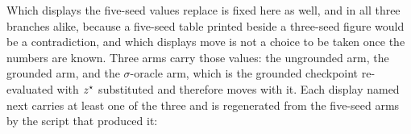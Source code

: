 Which displays the five-seed values replace is fixed here as well, and in all three branches alike,
because a five-seed table printed beside a three-seed figure would be a contradiction, and which
displays move is not a choice to be taken once the numbers are known. Three arms carry those values: the ungrounded arm, the
grounded arm, and the $\sigma$-oracle arm, which is the grounded checkpoint re-evaluated with
$z^\star$ substituted and therefore moves with it. Each display named next carries at least one of the
three and is regenerated from the five-seed arms by the script that produced it:
